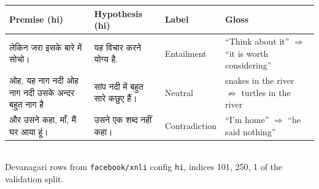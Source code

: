 \documentclass[10pt]{article}
\begin{document}
\begin{center}
\begin{tabular*}{\textwidth}{@{\extracolsep{\fill}}p{}p{}lp{}@{}}
\toprule
\textbf{Premise (hi)} & \textbf{Hypothesis (hi)} & \textbf{Label} & \textbf{Gloss} \\
\midrule
लेकिन जरा इसके बारे में सोचो। & यह विचार करने योग्य है. & Entailment & ``Think about it'' $\Rightarrow$ ``it is worth considering'' \\
ओह, यह नाग नदी ओह नाग नदी उसके अन्दर बहुत नाग है & सांप नदी में बहुत सारे कछुए हैं। & Neutral & snakes in the river $\not\Rightarrow$ turtles in the river \\
और उसने कहा, माँ, मैं घर आया हूं। & उसने एक शब्द नहीं कहा। & Contradiction & ``I'm home'' $\Rightarrow$ ``he said nothing'' \\
\bottomrule
\end{tabular*}\\[0.6em]
{\footnotesize Devanagari rows from \texttt{facebook/xnli} config \texttt{hi}, indices 101, 250, 1 of the validation split.}
\end{center}
\end{document}
